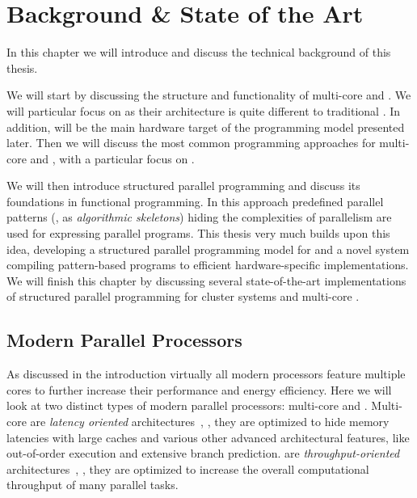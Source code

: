 
\chapter{Background \& State of the Art} %

\label{chapter:background}
\label{chapter:state-of-the-art}

In this chapter we will introduce and discuss the technical background of this thesis.

We will start by discussing the structure and functionality of multi-core \CPUs and \GPUs.
We will particular focus on \GPUs as their architecture is quite different to traditional \CPUs.
In addition, \GPUs will be the main hardware target of the \SkelCL programming model presented later.
Then we will discuss the most common programming approaches for multi-core \CPUs and \GPUs, with a particular focus on \OpenCL.

We will then introduce structured parallel programming and discuss its foundations in functional programming.
In this approach predefined parallel patterns (\aka, as \emph{algorithmic skeletons}) hiding the complexities of parallelism are used for expressing parallel programs.
This thesis very much builds upon this idea, developing a structured parallel programming model for \GPUs and a novel system compiling pattern-based programs to efficient hardware-specific implementations.
We will finish this chapter by discussing several state-of-the-art implementations of structured parallel programming for cluster systems and multi-core \CPUs.

\section{Modern Parallel Processors}
As discussed in the introduction virtually all modern processors feature multiple cores to further increase their performance and energy efficiency.
Here we will look at two distinct types of modern parallel processors: multi-core \CPUs and \GPUs.
Multi-core \CPUs are \emph{latency oriented} architectures~\cite{GarlandK10}, \ie, they are optimized to hide memory latencies with large caches and various other advanced architectural features, like out-of-order execution and extensive branch prediction.
\GPUs are \emph{throughput-oriented} architectures~\cite{GarlandK10}, \ie, they are optimized to increase the overall computational throughput of many parallel tasks.

